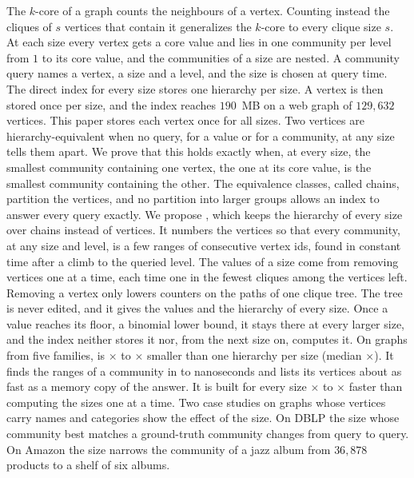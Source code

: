 The $k$-core of a graph counts the neighbours of a vertex.
%
Counting instead the cliques of $s$ vertices that contain it generalizes the $k$-core to every clique size $s$.
%
At each size every vertex gets a core value and lies in one community per level from $1$ to its core value, and the communities of a size are nested.
%
A community query names a vertex, a size and a level, and the size is chosen at query time.
%
The direct index for every size stores one hierarchy per size.
%
A vertex is then stored once per size, and the index reaches $190$~MB on a web graph of $129{,}632$ vertices.
%
This paper stores each vertex once for all sizes.
%
Two vertices are hierarchy-equivalent when no query, for a value or for a community, at any size tells them apart.
%
We prove that this holds exactly when, at every size, the smallest community containing one vertex, the one at its core value, is the smallest community containing the other.
%
The equivalence classes, called chains, partition the vertices, and no partition into larger groups allows an index to answer every query exactly.
%
We propose \chainidx, which keeps the hierarchy of every size over chains instead of vertices.
%
It numbers the vertices so that every community, at any size and level, is a few ranges of consecutive vertex ids, found in constant time after a climb to the queried level.
%
%
The values of a size come from removing vertices one at a time, each time one in the fewest cliques among the vertices left.
Removing a vertex only lowers counters on the paths of one clique tree.
%
The tree is never edited, and it gives the values and the hierarchy of every size.
%
Once a value reaches its floor, a binomial lower bound, it stays there at every larger size, and the index neither stores it nor, from the next size on, computes it.
%
On \numgraphs{} graphs from five families, \chainidx is \ratiomin$\times$ to \ratiomax$\times$ smaller than one hierarchy per size (median \ratiomedian$\times$).
%
It finds the ranges of a community in \locmin{} to \locmax{} nanoseconds and lists its vertices about as fast as a memory copy of the answer.
%
It is built for every size \priormin$\times$ to \priormax$\times$ faster than computing the sizes one at a time.
%
Two case studies on graphs whose vertices carry names and categories show the effect of the size.
%
On DBLP the size whose community best matches a ground-truth community changes from query to query.
%
On Amazon the size narrows the community of a jazz album from $36{,}878$ products to a shelf of six albums.
